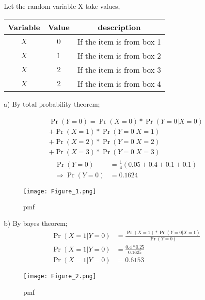 \documentclass{beamer}
\providecommand{\pr}[1]{\ensuremath{\Pr\left(#1\right)}}
\begin{document}
     \begin{frame}
         Let the random variable X take values,\\
 \begin{table}[h!]
    \centering
    \begin{tabular}{|c|c|c|} \hline
    \textbf{Variable} & \textbf{Value} & \textbf{description} \\ \hline
    $X$ & $0$ & If the item is from box 1 \\ \hline
        $X$ & $1$ & If the item is from box 2 \\ \hline
        $X$ & $2$ & If the item is from box 3 \\ \hline
        $X$ & $2$ & If the item is from box 4 \\ \hline
    
    \end{tabular}
    \end{table}
    \end{frame}
     
    \begin{frame}
     a) By total probability theorem;
    
    \begin{multline}
    \begin{split}
    \pr{Y=0}=\pr{X=0}*\pr{Y=0|X=0}\\+\pr{X=1}*\pr{Y=0|X=1}\\+
        \pr{X=2}*\pr{Y=0|X=2}\\+\pr{X=3}*\pr{Y=0|X=3}
\end{split}
\end{multline}
\begin{align}
    \pr{Y=0} &=\frac{1}{4}(0.05+0.4+0.1+0.1)\\
    \Rightarrow\pr{Y=0} &=0.1624
\end{align}    
\end{frame}
 \begin{frame}
        \begin{figure}[h!]
        \centering
        \texttt{[image: Figure\_1.png]}
        \caption{pmf}
        \label{fig:my_label}
    \end{figure}
    \end{frame}

\begin{frame}
  b) By bayes theorem;
    \begin{align}
           \pr{X=1|Y=0}&=\frac{\pr{X=1}*\pr{Y=0|X=1}}{\pr{Y=0}}\\
           \pr{X=1|Y=0}&=\frac{0.4*0.25}{0.1625}\\
           \pr{X=1|Y=0}&=0.6153
    \end{align}
    \end{frame}
    
   
    
    \begin{frame}
    \begin{figure}[h]
          \centering
          \texttt{[image: Figure\_2.png]}
          \caption{pmf}
          \label{fig:my_label}
      \end{figure}
    
        
    \end{frame}
     
\end{document}
